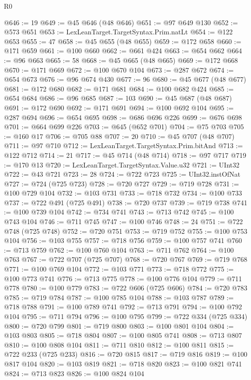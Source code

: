 \begin{lexlean}{R0}
\begin{coremodule}
@646 := 19
@649 := @45 @646 (@48 @646)
@651 := @97 @649 @130
@652 := @573 @651
@653 := LexLeanTarget.TargetSyntax.Prim.natLt
@654 := @122 @653
@655 := 47
@658 := @45 @655 (@48 @655)
@659 := @172 @658
@660 := @171 @659
@661 := @100 @660
@662 := @661 @424
@663 := @654 @662
@664 := @96 @663
@665 := 58
@668 := @45 @665 (@48 @665)
@669 := @172 @668
@670 := @171 @669
@672 := @100 @670 @104
@673 := @287 @672
@674 := @654 @673
@676 := @96 @674 @430
@677 := 96
@680 := @45 @677 (@48 @677)
@681 := @172 @680
@682 := @171 @681
@684 := @100 @682 @424
@685 := @654 @684
@686 := @96 @685
@687 := 103
@690 := @45 @687 (@48 @687)
@691 := @172 @690
@692 := @171 @691
@694 := @100 @692 @104
@695 := @287 @694
@696 := @654 @695
@698 := @686 @696 @226
@699 := @676 @698
@701 := @664 @699 @226
@703 := @645 (@652 @701)
@704 := @75 @703
@705 := @160 @17
@706 := @705 @88
@707 := 20
@710 := @45 @707 (@48 @707)
@711 := @97 @710
@712 := LexLeanTarget.TargetSyntax.Prim.bitAnd
@713 := @122 @712
@714 := 21
@717 := @45 @714 (@48 @714)
@718 := @97 @717
@719 := @170 @13
@720 := LexLeanTarget.TargetSyntax.Value.u32
@721 := UInt32
@722 := @43 @721
@723 := 28
@724 := @722 @723
@725 := UInt32.instOfNat
@727 := @724 (@725 @723)
@728 := @720 @727
@729 := @719 @728
@731 := @100 @729 @104
@732 := @103 @731
@733 := @718 @732
@734 := @100 @733
@737 := @722 @491 (@725 @491)
@738 := @720 @737
@739 := @719 @738
@741 := @100 @739 @104
@742 := @734 @741
@743 := @713 @742
@745 := @100 @743 @104
@746 := @711 @745
@747 := @100 @746
@748 := 24
@751 := @722 @748 (@725 @748)
@752 := @720 @751
@753 := @719 @752
@755 := @100 @753 @104
@756 := @103 @755
@757 := @718 @756
@759 := @100 @757 @741
@760 := @713 @759
@762 := @100 @760 @104
@763 := @711 @762
@764 := @100 @763
@767 := @722 @707 (@725 @707)
@768 := @720 @767
@769 := @719 @768
@771 := @100 @769 @104
@772 := @103 @771
@773 := @718 @772
@775 := @100 @773 @741
@776 := @713 @775
@778 := @100 @776 @104
@779 := @711 @778
@780 := @100 @779
@783 := @722 @606 (@725 @606)
@784 := @720 @783
@785 := @719 @784
@787 := @100 @785 @104
@788 := @103 @787
@789 := @718 @788
@791 := @100 @789 @741
@792 := @713 @791
@794 := @100 @792 @104
@795 := @711 @794
@796 := @100 @795
@799 := @722 @334 (@725 @334)
@800 := @720 @799
@801 := @719 @800
@803 := @100 @801 @104
@804 := @103 @803
@805 := @718 @804
@807 := @100 @805 @741
@808 := @713 @807
@810 := @100 @808 @104
@811 := @711 @810
@812 := @100 @811
@815 := @722 @233 (@725 @233)
@816 := @720 @815
@817 := @719 @816
@819 := @100 @817 @104
@820 := @103 @819
@821 := @718 @820
@823 := @100 @821 @741
@824 := @713 @823
@826 := @100 @824 @104

\end{coremodule}
\end{lexlean}
